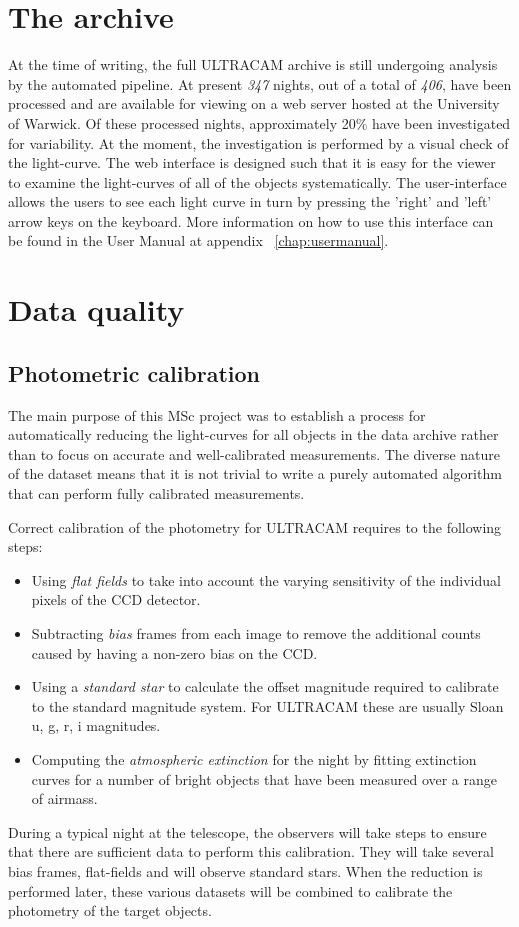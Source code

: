 \section{The archive} 

At the time of writing, the full ULTRACAM archive is still undergoing analysis by the automated pipeline. At present \emph{347} nights, out of a total of \emph{406}, have been processed and are available for viewing on a web server hosted at the University of Warwick. Of these processed nights, approximately 20\% have been investigated for variability. At the moment, the investigation is performed by a visual check of the light-curve. The web interface is designed such that it is easy for the viewer to examine the light-curves of all of the objects systematically. The user-interface allows the users to see each light curve in turn by pressing the 'right' and 'left'  arrow keys on the keyboard. More information on how to use this interface can be found in the User Manual at appendix ~\ref{chap:usermanual}. 

\section{Data quality}

\subsection{Photometric calibration}
The main purpose of this MSc project was to establish a process for automatically reducing the light-curves for all objects in the data archive rather than to focus on accurate and well-calibrated measurements. The diverse nature of the dataset means that it is not trivial to write a purely automated algorithm that can perform fully calibrated measurements. 

Correct calibration of the photometry for ULTRACAM requires to the following steps:
\begin{itemize}
  \item Using \emph{flat fields} to take into account the varying sensitivity of the individual pixels of the CCD detector. 
  \item Subtracting \emph{bias} frames from each image to remove the additional counts caused by having a non-zero bias on the CCD. 
  \item Using a \emph{standard star} to calculate the offset magnitude required to calibrate to the standard magnitude system. For ULTRACAM these are usually Sloan u, g, r, i magnitudes.
  \item Computing the \emph{atmospheric extinction} for the night by fitting extinction curves for a number of bright objects that have been measured over a range of airmass. 
\end{itemize}
During a typical night at the telescope, the observers will take steps to ensure that there are sufficient data to perform this calibration. They will take several bias frames, flat-fields and will observe standard stars. When the reduction is performed later, these various datasets will be combined to calibrate the photometry of the target objects. 

